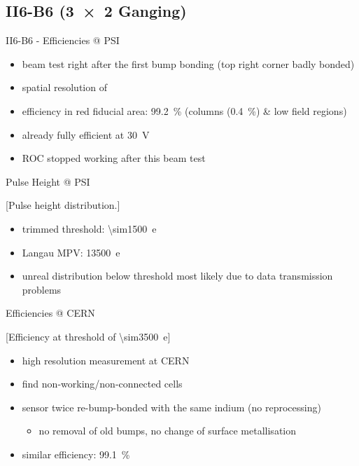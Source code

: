 \subsection{II6-B6 (\SI{3x2}{} Ganging)}
\begin{frame}{II6-B6 - Efficiencies @ PSI}

	
	\begin{itemize}\itemfill
		\item beam test right after the first bump bonding (top right corner badly bonded)
		\item spatial resolution of 
		\item efficiency in red fiducial area: \SI{99.2}{\%} (\ra columns (\SI{.4}{\%}) \& low field regions)
		\item already fully efficient at \SI{30}{\volt}
		\item ROC stopped working after this beam test
	\end{itemize}
	
\end{frame}
\begin{frame}{Pulse Height @ PSI}

	[Pulse height distribution.]	
	
	\begin{itemize}\itemfill
		\item trimmed threshold: \SI{\sim1500}{e}
		\item Langau MPV: \SI{13500}{e}
		\item unreal distribution below threshold most likely due to data transmission problems
	\end{itemize}
	
\end{frame}
\begin{frame}{Efficiencies @ CERN}

	\vspace*{-2ex}[Efficiency at threshold of \SI{\sim3500}{e}]\vspace*{-2ex}
	
	\begin{itemize}\itemfill
		\item high resolution measurement at CERN
		\item find non-working/non-connected cells
		\item sensor twice re-bump-bonded with the same indium (no reprocessing)
		\begin{itemize}
			\item no removal of old bumps, no change of surface metallisation
		\end{itemize}
		\item similar efficiency: \SI{99.1}{\%}
	\end{itemize}
	
\end{frame}
